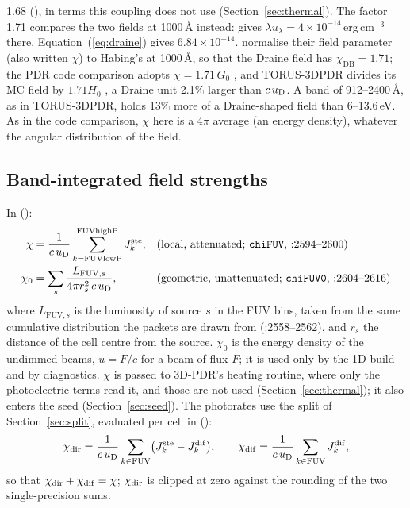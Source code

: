 \begin{itemize}
  1.68 (), in terms this coupling does
  not use (Section~\ref{sec:thermal}). The factor 1.71 compares the two fields
  at 1000\,\AA{} instead: \citet{Habing1968} gives $\lambda u_\lambda=4\times10^{-14}$\,erg\,cm$^{-3}$
  there, Equation~(\ref{eq:draine}) gives $6.84\times10^{-14}$.
  \citet{DraineBertoldi1996} normalise their field parameter (also written
  $\chi$) to Habing's at 1000\,\AA, so that the Draine field has $\chi_{\mathrm{DB}}=1.71$;
  the PDR code comparison adopts $\chi=1.71\,G_0$ \citep[their Table~5]{Rollig2007},
  and TORUS-3DPDR divides its MC field by $1.71H_0$ \citep[their Eq.~12]{Bisbas2015},
  a Draine unit 2.1\% larger than $c\,u_{\mathrm{D}}$. A band of 912--2400\,\AA, as in
  TORUS-3DPDR, holds 13\% more of a Draine-shaped field than 6--13.6\,eV. As in
  the code comparison, $\chi$ here is a $4\pi$ average (an energy density),
  whatever the angular distribution of the field.
\end{itemize}

\subsection{Band-integrated field strengths}

In  ():
\begin{align}
  \chi &= \frac{1}{c\,\uD}\sum_{k=\mathrm{FUVlowP}}^{\mathrm{FUVhighP}} \Jste_k ,
  &&\text{(local, attenuated; \rtn{chiFUV}, :2594--2600)} \label{eq:chi}\\
  \chi_0 &= \sum_s \frac{L_{\mathrm{FUV},s}}{4\pi r_s^2\, c\,\uD},
  &&\text{(geometric, unattenuated; \rtn{chiFUV0}, :2604--2616)} \label{eq:chi0}
\end{align}
where $L_{\mathrm{FUV},s}$ is the luminosity of source $s$ in the FUV bins,
taken from the same cumulative distribution the packets are drawn from
(:2558--2562), and $r_s$ the distance of the cell centre from the source.
$\chi_0$ is the energy density of the undimmed beams, $u=F/c$ for a beam of
flux $F$; it is used only by the 1D build and by diagnostics. $\chi$ is passed
to 3D-PDR's heating routine, where only the photoelectric terms read it, and
those are not used (Section~\ref{sec:thermal}); it also enters the seed
(Section~\ref{sec:seed}). The photorates use the split of
Section~\ref{sec:split}, evaluated per cell in 
():
\begin{equation}
  \chi_{\mathrm{dir}} = \frac{1}{c\,u_{\mathrm{D}}}\sum_{k\in\mathrm{FUV}} \bigl(J^{\mathrm{ste}}_k-J^{\mathrm{dif}}_k\bigr),
  \qquad
  \chi_{\mathrm{dif}} = \frac{1}{c\,u_{\mathrm{D}}}\sum_{k\in\mathrm{FUV}} J^{\mathrm{dif}}_k ,
  \label{eq:chisplit}
\end{equation}
so that $\chi_{\mathrm{dir}}+\chi_{\mathrm{dif}}=\chi$; $\chi_{\mathrm{dir}}$ is clipped at zero against the rounding of
the two single-precision sums.

